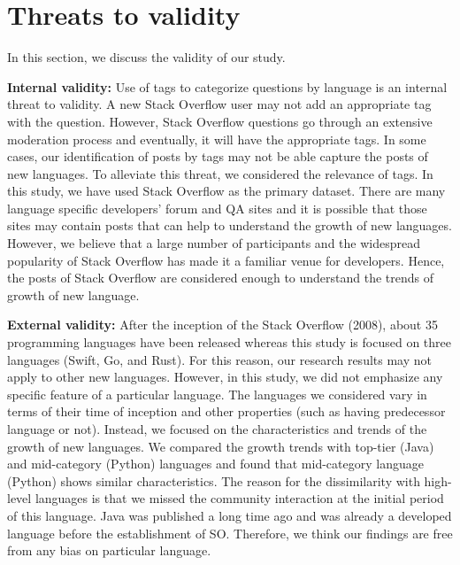 \section{Threats to validity}
\label{sec:validity}
In this section, we discuss the validity of our study.

\indent \textbf{Internal validity:} Use of tags to categorize questions by language is an internal threat to validity. A new Stack Overflow user may not add an appropriate tag with the question. However, Stack Overflow questions go through an extensive moderation process and eventually, it will have the appropriate tags. In some cases, our identification of posts by tags may not be able capture the posts of new languages. To alleviate this threat, we considered the relevance of tags.  In this study, we have used Stack Overflow as the primary dataset. There are many language specific developers' forum and QA sites and it is possible that those sites may contain posts that can help to understand the growth of new languages. However, we believe that a large number of participants and the widespread popularity of Stack Overflow has made it a familiar venue for developers. Hence, the posts of Stack Overflow are considered enough to understand the trends of growth of new language.

\indent \textbf{External validity:} After the inception of the Stack Overflow (2008), about 35 programming languages have been released\citep{wiki:Timeline} whereas this study is focused on three languages (Swift, Go, and Rust). For this reason, our research results may not apply to other new languages. However, in this study, we did not emphasize any specific feature of a particular language. The languages we considered vary in terms of their time of inception and other properties (such as having predecessor language or not). Instead, we focused on the characteristics and trends of the growth of new languages. We compared the growth trends with top-tier (Java) and mid-category (Python) languages and found that mid-category language (Python) shows similar characteristics. The reason for the dissimilarity with high-level languages is that we missed the community interaction at the initial period of this language. Java was published a long time ago and was already a developed language before the establishment of SO. Therefore, we think our findings are free from any bias on particular language.

\iffalse

\indent \textbf{Construct validity:} In this study, votes of accepted answers are given double weight in the calculation of post quality. The weight used may not represent their exact contribution. However, the magnitude of weight do not influence our analysis. Thus, double weight in the accepted answer will not invalidate our claim.
\fi